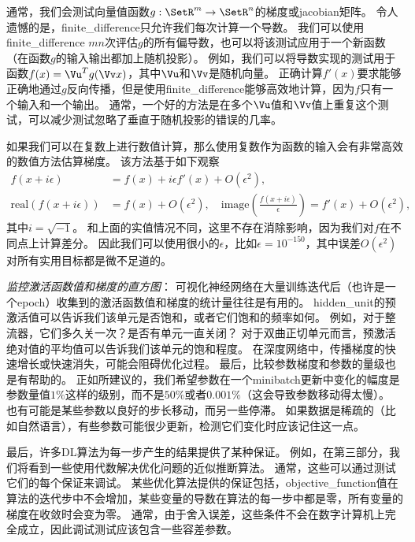 
通常，我们会测试向量值函数$g:\SetR^m \to \SetR^n$的梯度或\gls{jacobian}矩阵。
令人遗憾的是，\gls{finite_difference}只允许我们每次计算一个导数。
我们可以使用\gls{finite_difference} $mn$次评估$g$的所有偏导数，也可以将该测试应用于一个新函数（在函数$g$的输入输出都加上随机投影）。%
例如，我们可以将导数实现的测试用于函数$f(x) = \Vu^T g(\Vv x)$，其中$\Vu$和$\Vv$是随机向量。%
正确计算$f'(x)$要求能够正确地通过$g$反向传播，但是使用\gls{finite_difference}能够高效地计算，因为$f$只有一个输入和一个输出。
通常，一个好的方法是在多个$\Vu$值和$\Vv$值上重复这个测试，可以减少测试忽略了垂直于随机投影的错误的几率。%


如果我们可以在复数上进行数值计算，那么使用复数作为函数的输入会有非常高效的数值方法估算梯度\citep{Squire+Trapp-1998}。
该方法基于如下观察
\begin{align}
	f(x + i\epsilon) &= f(x) + i\epsilon f'(x) + O(\epsilon^2) ,\\
	\text{real}( f(x+i\epsilon) ) &= f(x) + O(\epsilon^2), \quad \text{image}( \frac{f(x+i\epsilon)}{ \epsilon } ) = f'(x) + O(\epsilon^2),
\end{align}
其中$i=\sqrt{-1}$。
和上面的实值情况不同，这里不存在消除影响，因为我们对$f$在不同点上计算差分。
因此我们可以使用很小的$\epsilon$，比如$\epsilon = 10^{-150}$，其中误差$O(\epsilon^2)$对所有实用目标都是微不足道的。


\emph{监控激活函数值和梯度的直方图}：
可视化神经网络在大量训练迭代后（也许是一个\gls{epoch}）收集到的激活函数值和梯度的统计量往往是有用的。
\gls{hidden_unit}的预激活值可以告诉我们该单元是否饱和，或者它们饱和的频率如何。
例如，对于整流器，它们多久关一次？是否有单元一直关闭？
对于双曲正切单元而言，预激活绝对值的平均值可以告诉我们该单元的饱和程度。
在深度网络中，传播梯度的快速增长或快速消失，可能会阻碍优化过程。
最后，比较参数梯度和参数的量级也是有帮助的。
正如\citep{Bottou-DLSS2015}所建议的，我们希望参数在一个\gls{minibatch}更新中变化的幅度是参数量值$1\%$这样的级别，而不是$50\%$或者$0.001\%$（这会导致参数移动得太慢）。
也有可能是某些参数以良好的步长移动，而另一些停滞。
如果数据是稀疏的（比如自然语言），有些参数可能很少更新，检测它们变化时应该记住这一点。


最后，许多\gls{DL}算法为每一步产生的结果提供了某种保证。
例如，在第三部分，我们将看到一些使用代数解决优化问题的近似推断算法。
通常，这些可以通过测试它们的每个保证来调试。
某些优化算法提供的保证包括，\gls{objective_function}值在算法的迭代步中不会增加，某些变量的导数在算法的每一步中都是零，所有变量的梯度在收敛时会变为零。
通常，由于舍入误差，这些条件不会在数字计算机上完全成立，因此调试测试应该包含一些容差参数。

